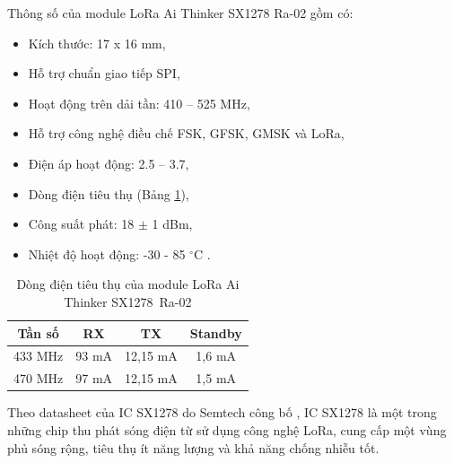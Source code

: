 \par 
Thông số của module LoRa Ai Thinker SX1278 Ra-02 \cite{7} gồm có:
\begin{itemize}
\item Kích thước: 17 x 16 mm,
\item Hỗ trợ chuẩn giao tiếp SPI,
\item Hoạt động trên dải tần: 410 – 525 MHz,
\item Hỗ trợ công nghệ điều chế FSK, GFSK, GMSK và LoRa,
\item Điện áp hoạt động: 2.5 – 3.7,
\item Dòng điện tiêu thụ (Bảng \ref{bang2_1}),
\item Công suất phát: 18 $\pm$ 1 dBm,
\item Nhiệt độ hoạt động: -30 - 85 $^{\circ}$C .
\end{itemize}
\begin{table}[h]
    \centering
    \caption{Dòng điện tiêu thụ của module LoRa Ai Thinker SX1278~Ra-02 \cite{7}}
    \begin{tabular}{|c|c|c|c|}
     	\hline
     	Tần số & RX & TX & Standby \\
     	\hline
     	433 MHz & 93 mA & 12,15 mA & 1,6 mA \\
     	\hline
     	470 MHz & 97 mA & 12,15 mA & 1,5 mA \\
     	\hline
    \end{tabular}
    \label{bang2_1}
\end{table}
Theo datasheet của IC SX1278 do Semtech công bố \cite{8}, IC SX1278 là một trong những chip thu phát sóng điện từ sử dụng công nghệ LoRa, cung cấp một vùng phủ sóng rộng, tiêu thụ ít năng lượng và khả năng chống nhiễu tốt.
